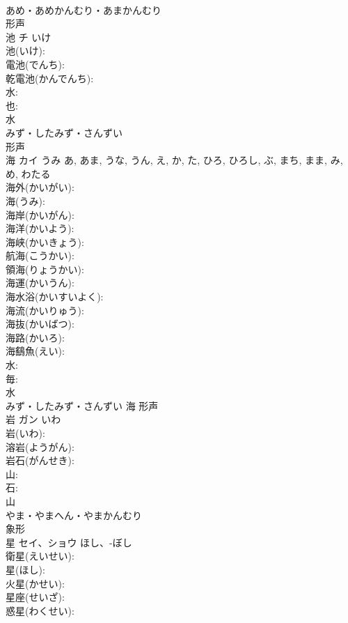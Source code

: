 \documentclass[8pt]{extreport}
\begin{document}
\begin{CJK}{UTF8}{min}
\\	あめ・あめかんむり・あまかんむり	
\\	形声 
\\	池	チ	いけ		
\\	池(いけ): 
\\	電池(でんち): 
\\	乾電池(かんでんち): 
\\	水: 
\\	也: 
\\	水	
\\	みず・したみず・さんずい	
\\	形声 
\\	海	カイ	うみ	あ, あま, うな, うん, え, か, た, ひろ, ひろし, ぶ, まち, まま, み, め, わたる	
\\	海外(かいがい): 
\\	海(うみ): 
\\	海岸(かいがん): 
\\	海洋(かいよう): 
\\	海峡(かいきょう): 
\\	航海(こうかい): 
\\	領海(りょうかい): 
\\	海運(かいうん): 
\\	海水浴(かいすいよく): 
\\	海流(かいりゅう): 
\\	海抜(かいばつ): 
\\	海路(かいろ): 
\\	海鷂魚(えい): 
\\	水: 
\\	毎: 
\\	水	
\\	みず・したみず・さんずい	海	形声 
\\	岩	ガン	いわ		
\\	岩(いわ): 
\\	溶岩(ようがん): 
\\	岩石(がんせき): 
\\	山: 
\\	石: 
\\	山	
\\	やま・やまへん・やまかんむり	
\\	象形 
\\	星	セイ、ショウ	ほし、-ぼし		
\\	衛星(えいせい): 
\\	星(ほし): 
\\	火星(かせい): 
\\	星座(せいざ): 
\\	惑星(わくせい): 

\end{CJK}
\end{document}
